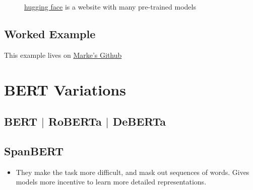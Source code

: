 \documentclass[11pt]{article}
\begin{document}
\begin{figure}[H]
    \centering
    \caption*{\href{https://huggingface.co/}{hugging face} is a website with many pre-trained models}
\end{figure}    

\subsection{Worked Example}

This example lives on \href{https://github.com/marekrei/bert_text_classification_example}{Marke's Github}

\begin{figure}[H]
    \centering
\end{figure}    

\section{BERT Variations}

\subsection{BERT $\vert$ RoBERTa $\vert$ DeBERTa}

\begin{figure}[H]
    \centering
\end{figure}    

\subsection{SpanBERT}

\begin{minipage}[l]{.5\linewidth}
    \begin{figure}[H]
        \centering
    \end{figure}    
\end{minipage}\hfill
\begin{minipage}[r]{.48\linewidth}
    \begin{itemize}
        \item They make the task more difficult, and mask out sequences of words. Gives models more incentive to learn more detailed representations.
    \end{itemize}
\end{minipage}
\end{document}
